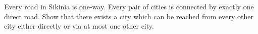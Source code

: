 Every road in Sikinia is one-way. Every pair of cities is connected by exactly one direct road. Show that there exists a city which can be reached from every other city either directly or via at most one other city.
